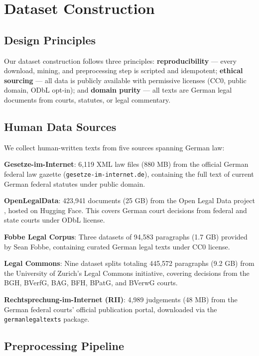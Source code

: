 \documentclass[11pt,a4paper]{article}
\begin{document}
\section{Dataset Construction}

\subsection{Design Principles}

Our dataset construction follows three principles: \textbf{reproducibility} --- every download, mining, and preprocessing step is scripted and idempotent; \textbf{ethical sourcing} --- all data is publicly available with permissive licenses (CC0, public domain, ODbL opt-in); and \textbf{domain purity} --- all texts are German legal documents from courts, statutes, or legal commentary.

\subsection{Human Data Sources}

We collect human-written texts from five sources spanning German law:

\textbf{Gesetze-im-Internet}: 6,119 XML law files (880 MB) from the official German federal law gazette ({\tt gesetze-im-internet.de}), containing the full text of current German federal statutes under public domain.

\textbf{OpenLegalData}: 423,941 documents (25 GB) from the Open Legal Data project \cite{ostendorff2020openlegal}, hosted on Hugging Face. This covers German court decisions from federal and state courts under ODbL license.

\textbf{Fobbe Legal Corpus}: Three datasets of 94,583 paragraphs (1.7 GB) provided by Sean Fobbe, containing curated German legal texts under CC0 license.

\textbf{Legal Commons}: Nine dataset splits totaling 445,572 paragraphs (9.2 GB) from the University of Zurich's Legal Commons initiative, covering decisions from the BGH, BVerfG, BAG, BFH, BPatG, and BVerwG courts.

\textbf{Rechtsprechung-im-Internet (RII)}: 4,989 judgements (48 MB) from the German federal courts' official publication portal, downloaded via the {\tt germanlegaltexts} package.

\subsection{Preprocessing Pipeline}
\end{document}
